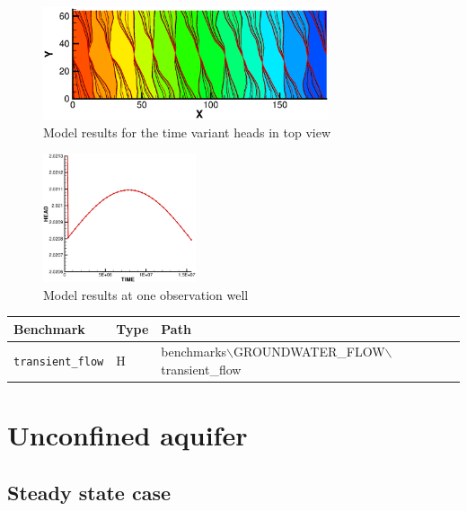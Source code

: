 \begin{figure}[htbp]
\centering
\includegraphics[width=0.75\textwidth]{H_GW/figures/time_variant_heads_results.eps}
\caption{Model results for the time variant heads in top view}
\label{time_variant_heads_results}
\end{figure}

\begin{figure}[htbp]
\centering
\includegraphics[width=0.4\textwidth]{H_GW/figures/time_variant_heads_observationwell.eps}
\caption{Model results at one observation well}
\label{time_variant_heads_observationwell}
\end{figure}

\begin{table}[htbp]
\centering
\begin{tabular}{|l|l|l|}
\hline
Benchmark & Type & Path \\
\hline
\texttt{transient\_flow}& H &  benchmarks$\backslash$GROUNDWATER\_FLOW$\backslash$transient\_flow  \\			
\hline
\end{tabular}
\end{table}


%
\section{Unconfined aquifer}
\label{sec:Groundwater_unconfined}
%
\subsection{Steady state case}
%
